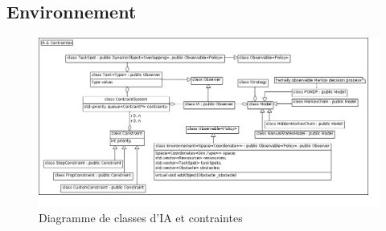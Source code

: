 \subsection{Environnement}
\begin{figure}[!h]\centering
   \includegraphics[scale=0.5]{images/c_ia_contraintes.png}
   \caption{\label{c_ia_contraintes} Diagramme de classes d'IA et contraintes}
\end{figure}
